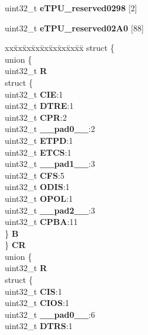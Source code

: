 \begin{DoxyCompactItemize}
\begin{tabbing}
\end{tabbing}\item 
\mbox{\label{structETPU__tag_ab2d934dd5a45ce568325948b8226a319}} 
uint32\+\_\+t {\bfseries e\+T\+P\+U\+\_\+reserved0298} \mbox{[}2\mbox{]}
\item 
\mbox{\label{structETPU__tag_af3b4359954daf3c7b92a9df073862f11}} 
uint32\+\_\+t {\bfseries e\+T\+P\+U\+\_\+reserved02\+A0} \mbox{[}88\mbox{]}
\item 
\mbox{\label{structETPU__tag_a44eece4034540494c9d643187c7e6b9e}} 
\begin{tabbing}
xx\=xx\=xx\=xx\=xx\=xx\=xx\=xx\=xx\=\kill
struct \{\\
\>union \{\\
\>\>uint32\_t {\bfseries R}\\
\>\>struct \{\\
\>\>\>uint32\_t {\bfseries CIE}:1\\
\>\>\>uint32\_t {\bfseries DTRE}:1\\
\>\>\>uint32\_t {\bfseries CPR}:2\\
\>\>\>uint32\_t {\bfseries \_\_pad0\_\_}:2\\
\>\>\>uint32\_t {\bfseries ETPD}:1\\
\>\>\>uint32\_t {\bfseries ETCS}:1\\
\>\>\>uint32\_t {\bfseries \_\_pad1\_\_}:3\\
\>\>\>uint32\_t {\bfseries CFS}:5\\
\>\>\>uint32\_t {\bfseries ODIS}:1\\
\>\>\>uint32\_t {\bfseries OPOL}:1\\
\>\>\>uint32\_t {\bfseries \_\_pad2\_\_}:3\\
\>\>\>uint32\_t {\bfseries CPBA}:11\\
\>\>\} {\bfseries B}\\
\>\} {\bfseries CR}\\
\>union \{\\
\>\>uint32\_t {\bfseries R}\\
\>\>struct \{\\
\>\>\>uint32\_t {\bfseries CIS}:1\\
\>\>\>uint32\_t {\bfseries CIOS}:1\\
\>\>\>uint32\_t {\bfseries \_\_pad0\_\_}:6\\
\>\>\>uint32\_t {\bfseries DTRS}:1\\

\end{tabbing}
\end{DoxyCompactItemize}
